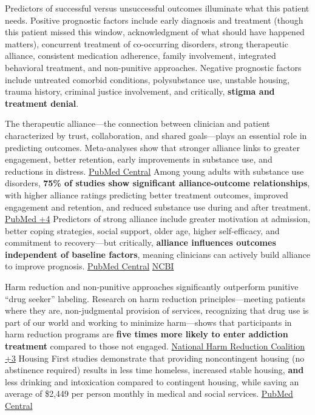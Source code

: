 Predictors of successful versus unsuccessful outcomes illuminate what this patient needs. Positive prognostic factors include early diagnosis and treatment (though this patient missed this window, acknowledgment of what should have happened matters), concurrent treatment of co-occurring disorders, strong therapeutic alliance, consistent medication adherence, family involvement, integrated behavioral treatment, and non-punitive approaches. Negative prognostic factors include untreated comorbid conditions, polysubstance use, unstable housing, trauma history, criminal justice involvement, and critically, \textbf{stigma and treatment denial}.

The therapeutic alliance---the connection between clinician and patient characterized by trust, collaboration, and shared goals---plays an essential role in predicting outcomes. Meta-analyses show that stronger alliance links to greater engagement, better retention, early improvements in substance use, and reductions in distress. \href{https://pmc.ncbi.nlm.nih.gov/articles/PMC7813220/}{PubMed Central} Among young adults with substance use disorders, \textbf{75\% of studies show significant alliance-outcome relationships}, with higher alliance ratings predicting better treatment outcomes, improved engagement and retention, and reduced substance use during and after treatment. \href{https://pubmed.ncbi.nlm.nih.gov/15733244/}{PubMed +4} Predictors of strong alliance include greater motivation at admission, better coping strategies, social support, older age, higher self-efficacy, and commitment to recovery---but critically, \textbf{alliance influences outcomes independent of baseline factors}, meaning clinicians can actively build alliance to improve prognosis. \href{https://pmc.ncbi.nlm.nih.gov/articles/PMC3345301/}{PubMed Central} \href{https://www.ncbi.nlm.nih.gov/pmc/articles/PMC3345301/}{NCBI}

Harm reduction and non-punitive approaches significantly outperform punitive ``drug seeker'' labeling. Research on harm reduction principles---meeting patients where they are, non-judgmental provision of services, recognizing that drug use is part of our world and working to minimize harm---shows that participants in harm reduction programs are \textbf{five times more likely to enter addiction treatment} compared to those not engaged. \href{https://harmreduction.org/about-us/principles-of-harm-reduction/}{National Harm Reduction Coalition +3} Housing First studies demonstrate that providing noncontingent housing (no abstinence required) results in less time homeless, increased stable housing, \textbf{and} less drinking and intoxication compared to contingent housing, while saving an average of \$2,449 per person monthly in medical and social services. \href{https://pmc.ncbi.nlm.nih.gov/articles/PMC3928290/}{PubMed Central}

